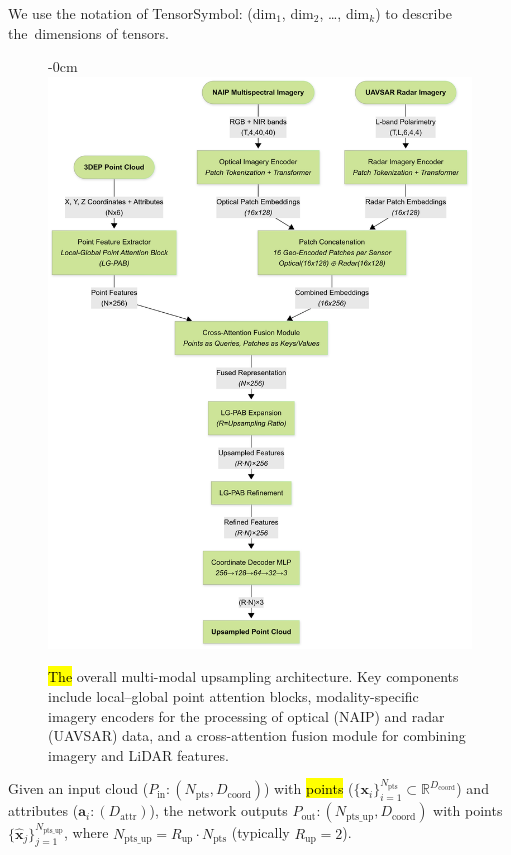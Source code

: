 \documentclass[remotesensing,article,accept,pdftex,moreauthors]{Definitions/mdpi}
\begin{document}
We use the notation of TensorSymbol: (dim$_1$, dim$_2$, \dots, dim$_k$) to describe the~dimensions of tensors.






\begin{figure}[H]
\begin{adjustwidth}{-\extralength}{0cm}
    \centering
    \includegraphics[trim=0mm 0mm 0mm 9mm, clip, width=0.9\linewidth]{figures/Overall_Architecture.png}
    \end{adjustwidth}
    \caption{\hl{The} %
 overall multi-modal upsampling architecture. Key components include local–global point attention blocks, modality-specific imagery encoders for the processing of optical (NAIP) and radar (UAVSAR) data, and a cross-attention fusion module for combining imagery and LiDAR features.}
    \label{fig:pipeline}
\end{figure} 


Given an input cloud ($P_{\text{in}}: (N_{\text{pts}}, D_{\text{coord}})$) with \hl{points} %
 ($\{\mathbf{{x}}_i\}_{i=1}^{N_{\text{pts}}}\subset\mathbb{R}^{D_{\text{coord}}}$) and attributes ($\mathbf{a}_i: (D_{\text{attr}})$), the network outputs $P_{\text{out}}: (N_{\text{pts\_up}}, D_{\text{coord}})$ with points $\{\hat{\mathbf{x}}_j\}_{j=1}^{N_{\text{pts\_up}}}$, where $N_{\text{pts\_up}} = R_{\text{up}} \cdot N_{\text{pts}}$ (typically $R_{\text{up}} = 2$).
\end{document}
